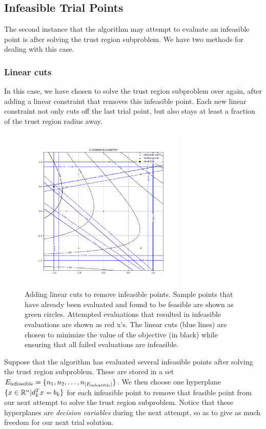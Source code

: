 \subsection{Infeasible Trial Points}
\label{convex_model_reduction}

The second instance that the algorithm may attempt to evaluate an infeasible point is after solving the trust region subproblem.
We have two methods for dealing with this case.

\subsubsection{Linear cuts}
\label{linear_cuts_section}
In this case, we have chosen to solve the trust region subproblem over again, after adding a linear constraint that removes this infeasible point.
Each new linear constraint not only cuts off the last trial point, but also stays at least a fraction of the trust region radius away.

\begin{figure}[h]
    \centering
    \includegraphics[width=300px]{images/pyomo_cut_solution.png}
    \caption{
		Adding linear cuts to remove infeasible points.
		Sample points that have already been evaluated and found to be feasible are shown as green circles.
		Attempted evaluations that resulted in infeasible evaluations are shown as red x's.
		The linear cuts (blue lines) are chosen to minimize the value of the objective (in black) while ensuring that all failed evaluations are infeasible.
	}
    \label{pvip}
\end{figure}


Suppose that the algorithm has evaluated several infeasible points after solving the trust region subproblem.
These are stored in a set ${E_\textrm{infeasible}} = \{n_1, n_2, \ldots, n_{|{E_\textrm{infeasible}}|}\}$.
We then choose one hyperplane $\{x \in \mathbb R^n | d_k^Tx = b_k\}$ for each infeasible point to remove that feasible point from our next attempt to solve the trust region subproblem.
Notice that these hyperplanes are \emph{decision variables} during the next attempt, so as to give as much freedom for our next trial solution.

